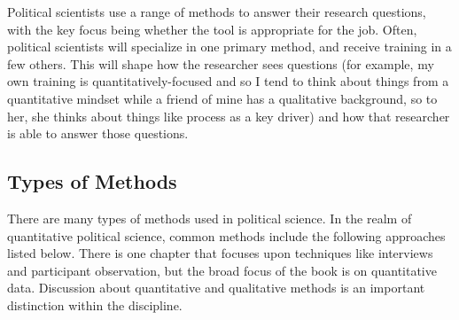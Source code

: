 \documentclass{book}
\begin{document}
Political scientists use a range of methods to answer their research
questions, with the key focus being whether the tool is appropriate for the
job. Often, political scientists will specialize in one primary method, and
receive training in a few others. This will shape how the researcher sees
questions (for example, my own training is quantitatively-focused and so I
tend to think about things from a quantitative mindset while a friend of mine
has a qualitative background, so to her, she thinks about things like process
as a key driver) and how that researcher is able to answer those questions.

\hypertarget{types-of-methods}{%
\subsection{Types of Methods}\label{types-of-methods}}

There are many types of methods used in political science. In the realm of
quantitative political science, common methods include the following
approaches listed below. There is one chapter that focuses upon techniques
like interviews and participant observation, but the broad focus of the book
is on quantitative data. Discussion about quantitative and qualitative methods
is an important distinction within the discipline.
\end{document}

